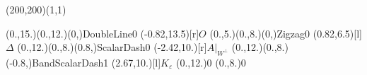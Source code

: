 \unitlength=1bp%

\begin{feynartspicture}(200,200)(1,1)

\FADiagram{}
\FAProp(0.,15.)(0.,12.)(0,){DoubleLine}{0}
\FALabel(-0.82,13.5)[r]{$O$}
\FAProp(0.,5.)(0.,8.)(0,){Zigzag}{0}
\FALabel(0.82,6.5)[l]{$\Delta$}
\FAProp(0.,12.)(0.,8.)(0.8,){ScalarDash}{0}
\FALabel(-2.42,10.)[r]{$A|_{W^\perp}$}
\FAProp(0.,12.)(0.,8.)(-0.8,){BandScalarDash}{1}
\FALabel(2.67,10.)[l]{$K_\varepsilon$}
\FAVert(0.,12.){0}
\FAVert(0.,8.){0}
\end{feynartspicture}

